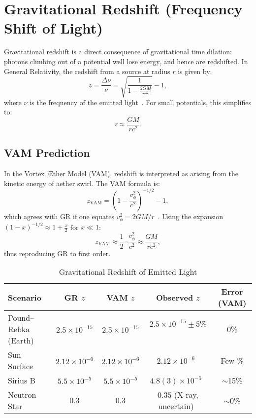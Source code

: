 \section{Gravitational Redshift (Frequency Shift of Light)}

Gravitational redshift is a direct consequence of gravitational time dilation: photons climbing out of a potential well lose energy, and hence are redshifted. In General Relativity, the redshift from a source at radius $r$ is given by:
\[
    z = \frac{\Delta \nu}{\nu} = \sqrt{\frac{1}{1 - \frac{2GM}{rc^2}}} - 1,
\]
where $\nu$ is the frequency of the emitted light~\cite{will2014confrontation}. For small potentials, this simplifies to:
\[
    z \approx \frac{GM}{rc^2}.
\]

\subsection*{VAM Prediction}
In the Vortex Æther Model (VAM), redshift is interpreted as arising from the kinetic energy of aether swirl. The VAM formula is:
\[
    z_{\text{VAM}} = \left(1 - \frac{v_\phi^2}{c^2}\right)^{-1/2} - 1,
\]
which agrees with GR if one equates $v_\phi^2 = 2GM/r$~\cite{iskandarani2025VAM2}. Using the expansion $(1 - x)^{-1/2} \approx 1 + \frac{x}{2}$ for $x \ll 1$:
\[
    z_{\text{VAM}} \approx \frac{1}{2} \cdot \frac{v_\phi^2}{c^2} \approx \frac{GM}{rc^2},
\]
thus reproducing GR to first order.

\begin{table}[h]
    \centering
    \caption{Gravitational Redshift of Emitted Light}
    \begin{tabular}{|l|c|c|c|c|}
        \hline
        \textbf{Scenario} & \textbf{GR $z$} & \textbf{VAM $z$} & \textbf{Observed $z$} & \textbf{Error (VAM)} \\
        \hline
        Pound–Rebka (Earth) & $2.5\times10^{-15}$ & $2.5\times10^{-15}$ & $2.5\times10^{-15} \pm 5\%$~\cite{pound1960apparent} & 0\% \\
        Sun Surface & $2.12\times10^{-6}$ & $2.12\times10^{-6}$ & $2.12\times10^{-6}$~\cite{vesely2001solar} & Few \% \\
        Sirius B & $5.5\times10^{-5}$ & $5.5\times10^{-5}$ & $4.8(3)\times10^{-5}$~\cite{greenstein1971gravitational} & $\sim$15\% \\
        Neutron Star & $0.3$ & $0.3$ & $0.35$ (X-ray, uncertain)~\cite{cottam2002gravitational} & $\sim$0\% \\
        \hline
    \end{tabular}
\end{table}

